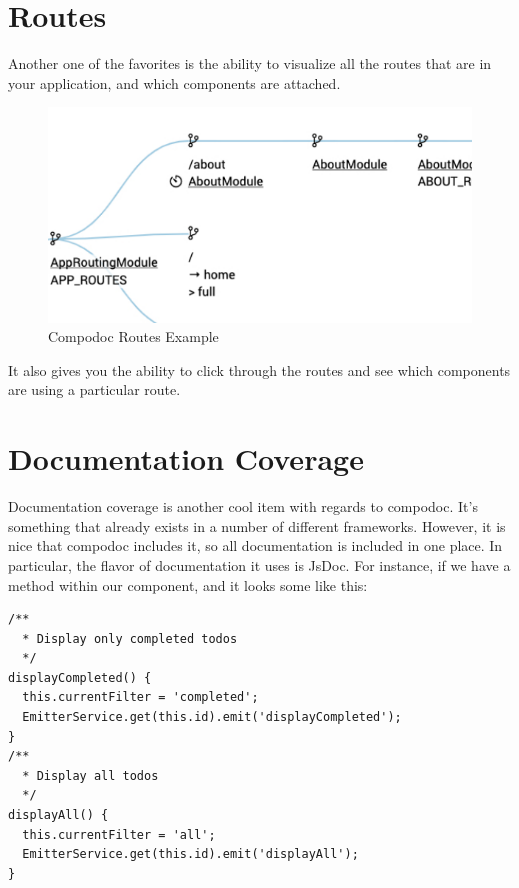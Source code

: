 \section{Routes}
Another one of the favorites is the ability to visualize all the routes that are in your application, and which components are attached. 

\begin{figure}[h!]
\caption{Compodoc Routes Example}
\includegraphics[width=414pt]{graphics/compodoc/routes/compodoc-routes.pdf}
\end{figure}

It also gives you the ability to click through the routes and see which components are using a particular route.

\section{Documentation Coverage}
Documentation coverage is another cool item with regards to compodoc. It's something that already exists in a number of different frameworks. However, it is nice that compodoc includes it, so all documentation is included in one place. In particular, the flavor of documentation it uses is JsDoc. For instance, if we have a method within our component, and it looks some like this: 
\begin{lstlisting}
/**
  * Display only completed todos
  */
displayCompleted() {
  this.currentFilter = 'completed';
  EmitterService.get(this.id).emit('displayCompleted');
}
/**
  * Display all todos
  */
displayAll() {
  this.currentFilter = 'all';
  EmitterService.get(this.id).emit('displayAll');
}
\end{lstlisting}

